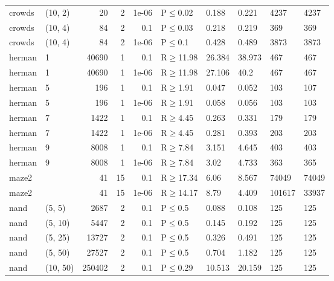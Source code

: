 \begin{longtable}{llrrrlllll}
 crowds        & (10, 2)   &     	20 &   2 & 1e-06 & P$\leq$0.02  & 0.188   & 0.221   & 4237   & 4237   \\
 crowds        & (10, 4)   &     	84 &   2 & 0.1   & P$\leq$0.03  & 0.218   & 0.219   & 369    & 369    \\
 crowds        & (10, 4)   &     	84 &   2 & 1e-06 & P$\leq$0.1   & 0.428   & 0.489   & 3873   & 3873   \\
 herman        & 1         &  	40690 &   1 & 0.1   & R$\geq$11.98 & 26.384  & 38.973  & 467    & 467    \\
 herman        & 1         &  	40690 &   1 & 1e-06 & R$\geq$11.98 & 27.106  & 40.2    & 467    & 467    \\
 herman        & 5         &    	196 &   1 & 0.1   & R$\geq$1.91  & 0.047   & 0.052   & 103    & 107    \\
 herman        & 5         &    	196 &   1 & 1e-06 & R$\geq$1.91  & 0.058   & 0.056   & 103    & 103    \\
 herman        & 7         &   	1422 &   1 & 0.1   & R$\geq$4.45  & 0.263   & 0.331   & 179    & 179    \\
 herman        & 7         &   	1422 &   1 & 1e-06 & R$\geq$4.45  & 0.281   & 0.393   & 203    & 203    \\
 herman        & 9         &   	8008 &   1 & 0.1   & R$\geq$7.84  & 3.151   & 4.645   & 403    & 403    \\
 herman        & 9         &   	8008 &   1 & 1e-06 & R$\geq$7.84  & 3.02    & 4.733   & 363    & 365    \\
 maze2         &           &     	41 &  15 & 0.1   & R$\geq$17.34 & 6.06    & 8.567   & 74049  & 74049  \\
 maze2         &           &     	41 &  15 & 1e-06 & R$\geq$14.17 & 8.79    & 4.409   & 101617 & 33937  \\
 nand          & (5, 5)    &   	2687 &   2 & 0.1   & P$\leq$0.5   & 0.088   & 0.108   & 125    & 125    \\
 nand          & (5, 10)   &   	5447 &   2 & 0.1   & P$\leq$0.5   & 0.145   & 0.192   & 125    & 125    \\
 nand          & (5, 25)   &  	13727 &   2 & 0.1   & P$\leq$0.5   & 0.326   & 0.491   & 125    & 125    \\
 nand          & (5, 50)   &  	27527 &   2 & 0.1   & P$\leq$0.5   & 0.704   & 1.182   & 125    & 125    \\
 nand          & (10, 50)  & 	250402 &   2 & 0.1   & P$\leq$0.29  & 10.513  & 20.159  & 125    & 125    \\

\end{longtable}

